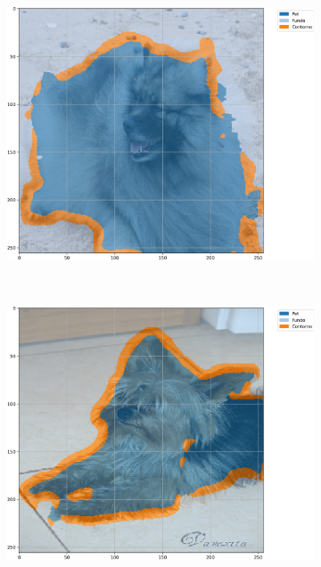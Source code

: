 \begin{figure}[H]
    \centering
    \caption[Segmentação com U-Net, BPCAPooling, 500 épocas, \textit{Oxford-IIIT Pets}, acurácia]{Exemplos segmentados a partir de U-Net com BPCAPooling e 500 épocas no conjunto de dados \textit{Oxford-IIIT Pets} baseada em acurácia.}
    \label{results:fig:semantic:5}
     \begin{subfigure}[t]{0.32\textwidth}
         \centering
         \includegraphics[width=1\linewidth]{recursos/imagens/results/bpca_acc_unet500_image_0_overlayed_segmentation.png}
         \label{results:fig:semantic:5.1}
     \end{subfigure}%
     ~ 
     \begin{subfigure}[t]{0.32\textwidth}
         \centering
         \includegraphics[width=1\linewidth]{recursos/imagens/results/bpca_acc_unet500_image_1_overlayed_segmentation.png}

\end{subfigure}
\end{figure}
